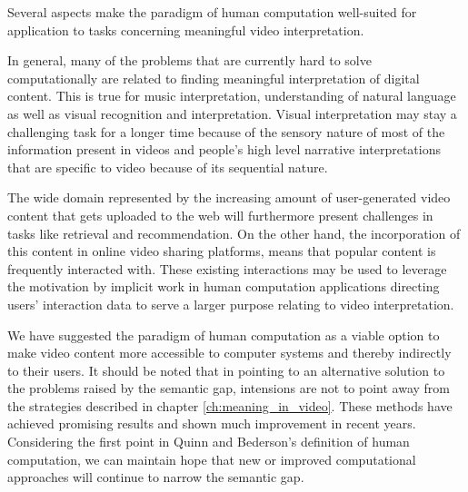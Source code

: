 Several aspects make the paradigm of human computation well-suited for application to tasks concerning meaningful video interpretation.

In general, many of the problems that are currently hard to solve computationally are related to finding meaningful interpretation of digital content. This is true for music interpretation, understanding of natural language as well as visual recognition and interpretation. Visual interpretation may stay a challenging task for a longer time because of the sensory nature of most of the information present in videos and people's high level narrative interpretations that are specific to video because of its sequential nature.

The wide domain represented by the increasing amount of user-generated video content that gets uploaded to the web will furthermore present challenges in tasks like retrieval and recommendation. On the other hand, the incorporation of this content in online video sharing platforms, means that popular content is frequently interacted with. These existing interactions may be used to leverage the motivation by implicit work in human computation applications directing users' interaction data to serve a larger purpose relating to video interpretation.

We have suggested the paradigm of human computation as a viable option to make video content more accessible to computer systems and thereby indirectly to their users. It should be noted that in pointing to an alternative solution to the problems raised by the semantic gap, intensions are not to point away from the strategies described in chapter \ref{ch:meaning_in_video}. These methods have achieved promising results and shown much improvement in recent years. Considering the first point in Quinn and Bederson's definition of human computation, we can maintain hope that new or improved computational approaches will continue to narrow the semantic gap.



